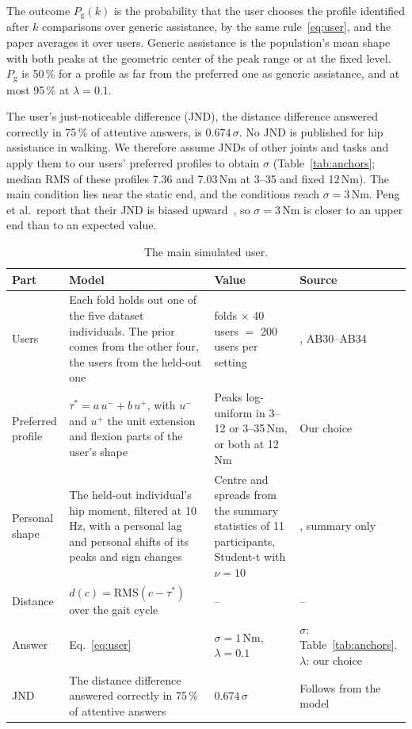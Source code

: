 \documentclass[10pt,a4paper]{article}
\newcommand{\Nm}{\,Nm}
\begin{document}
The outcome $P_\mathrm g(k)$ is the probability that the user chooses the profile identified after $k$ comparisons over
generic assistance, by the same rule~\eqref{eq:user}, and the paper averages it over users. Generic assistance is the
population's mean shape with both peaks at the geometric center of the peak range or at the fixed level.
$P_\mathrm g$ is 50\,\% for a profile as far from the preferred one as generic assistance, and at most 95\,\% at
$\lambda = 0.1$.

The user's just-noticeable difference (JND), the distance difference answered correctly in 75\,\% of attentive answers,
is $0.674\,\sigma$. No JND is published for hip assistance in walking. We therefore assume JNDs of
other joints and tasks and apply them to our users' preferred profiles to obtain $\sigma$ (Table~\ref{tab:anchors};
median RMS of these profiles 7.36 and 7.03\Nm{} at 3--35 and fixed 12\Nm). The main
condition lies near the static end, and the conditions reach $\sigma = 3$\Nm. Peng et al.\ report that their JND is
biased upward~\cite{peng}, so $\sigma = 3$\Nm{} is closer to an upper end than to an expected value.

\begin{table}[t]
\centering
\caption{The main simulated user.}
\label{tab:user}
\footnotesize
\begin{tabularx}{\textwidth}{@{}l>{\raggedright\arraybackslash}X>{\raggedright\arraybackslash}p{4.2cm}>{\raggedright\arraybackslash}p{3.4cm}@{}}
\toprule
Part & Model & Value & Source \\
\midrule
Users & Each fold holds out one of the five dataset individuals. The prior comes from the other four, the users from the
  held-out one & 5 folds $\times$ 40 users $=$ 200 users per setting & \cite{molinaro,molinarodata}, AB30--AB34 \\
Preferred profile & $\tau^\ast = a\,u^- + b\,u^+$, with $u^-$ and $u^+$ the unit extension and flexion parts of the
  user's shape & Peaks log-uniform in 3--12 or 3--35\Nm, or both at 12\Nm & Our choice \\
Personal shape & The held-out individual's hip moment, filtered at 10\,Hz, with a personal lag and personal shifts of
  its peaks and sign changes & Centre and spreads from the summary statistics of 11 participants, Student-t with
  $\nu = 10$ & \cite{schafer}, summary only \\
Distance & $d(c) = \mathrm{RMS}(c - \tau^\ast)$ over the gait cycle & -- & -- \\
Answer & Eq.~\eqref{eq:user} & $\sigma = 1$\Nm, $\lambda = 0.1$ & $\sigma$: Table~\ref{tab:anchors}. $\lambda$: our
  choice \\
JND & The distance difference answered correctly in 75\,\% of attentive answers & $0.674\,\sigma$ & Follows from the
  model \\
\bottomrule
\end{tabularx}
\end{table}
\end{document}
